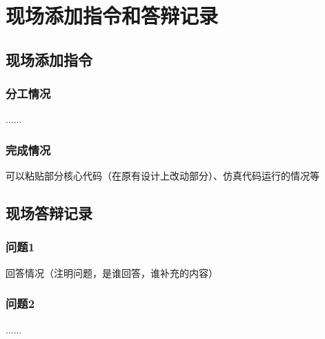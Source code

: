 \section{现场添加指令和答辩记录}

\subsection{现场添加指令}
\subsubsection{分工情况}
......
\subsubsection{完成情况}
可以粘贴部分核心代码（在原有设计上改动部分）、仿真代码运行的情况等
\subsection{现场答辩记录}
\subsubsection{问题1}
回答情况（注明问题，是谁回答，谁补充的内容）
\subsubsection{问题2}
......

